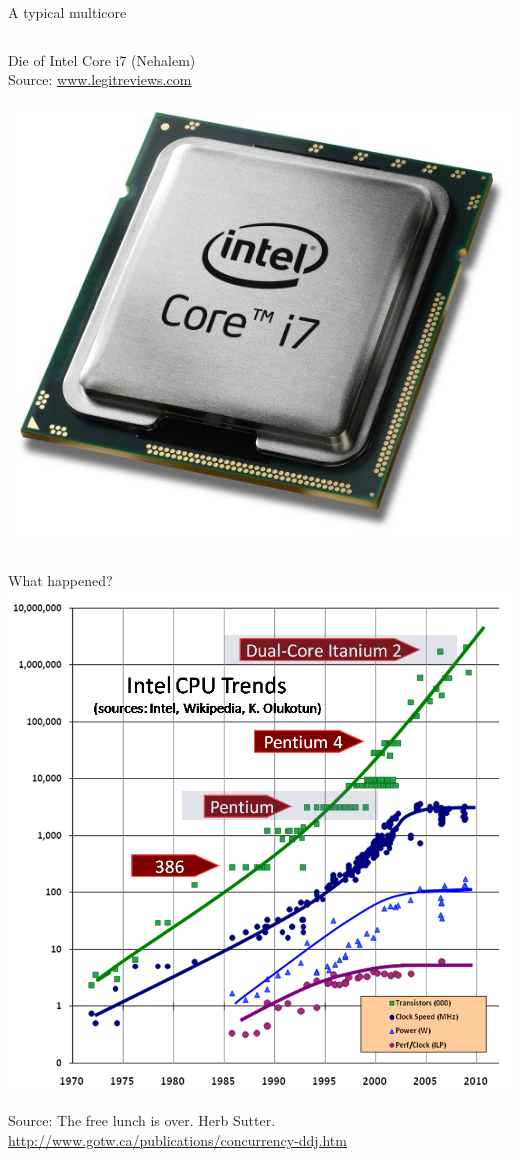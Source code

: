 \begin{frame}[t]{A typical multicore}
\begin{columns}
\begin{column}{.35\textwidth}
    \begin{tiny}
      Die of Intel Core i7 (Nehalem)\\
      Source: \url{www.legitreviews.com}\\
    \end{tiny}
    \vspace{0.75em}
    \begin{center}
    \includegraphics[width=.65\textwidth]{images/intel-core-i7.jpg}\\
    \end{center}
  \end{column}
\end{columns}
\end{frame}

\begin{frame}[t]{What happened?}
\includegraphics[height=.8\textheight,width=\textwidth]{images/free-lunch.png}\\
\begin{tiny}
Source: \alert{The free lunch is over}.
Herb Sutter.
\url{http://www.gotw.ca/publications/concurrency-ddj.htm}\\
\end{tiny}
\end{frame}

